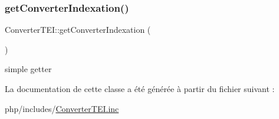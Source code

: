 \subsubsection{\texorpdfstring{get\+Converter\+Indexation()}{getConverterIndexation()}}
{\footnotesize\ttfamily Converter\+T\+E\+I\+::get\+Converter\+Indexation (\begin{DoxyParamCaption}{ }\end{DoxyParamCaption})}

simple getter 

La documentation de cette classe a été générée à partir du fichier suivant \+:\begin{DoxyCompactItemize}
\item 
php/includes/\hyperlink{_converter_t_e_i_8inc}{Converter\+T\+E\+I.\+inc}\end{DoxyCompactItemize}
